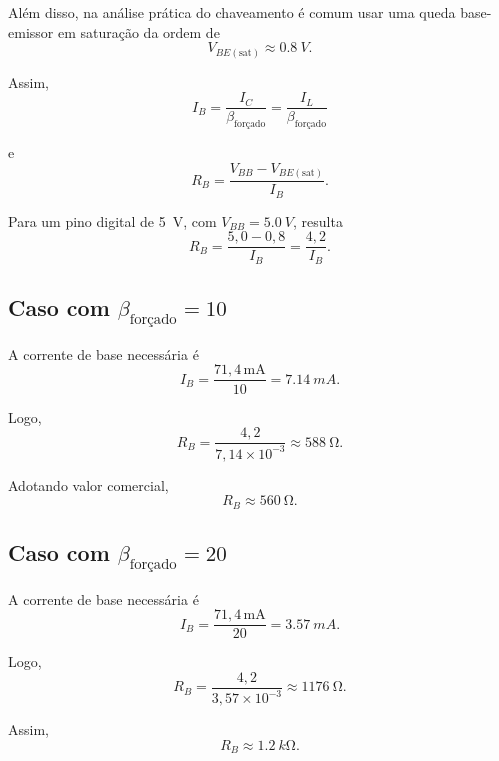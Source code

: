 \documentclass[12pt,a4paper]{article}
\newcommand{\Vbb}{V_{BB}}
\newcommand{\Vbesat}{V_{BE(\mathrm{sat})}}
\newcommand{\Ic}{I_C}
\newcommand{\Ib}{I_B}
\newcommand{\Il}{I_L}
\newcommand{\Rb}{R_B}
\newcommand{\betaf}{\beta_{\text{forçado}}}
\begin{document}
Além disso, na análise prática do chaveamento é comum usar uma queda base-emissor em saturação da ordem de
\begin{equation}
\Vbesat \approx \SI{0,8}{V}.
\end{equation}

Assim,
\begin{equation}
\Ib = \frac{\Ic}{\betaf} = \frac{\Il}{\betaf}
\end{equation}

e
\begin{equation}
\Rb = \frac{\Vbb - \Vbesat}{\Ib}.
\label{eq:rb_sat}
\end{equation}

Para um pino digital de \SI{5}{V}, com $\Vbb = \SI{5,0}{V}$, resulta
\begin{equation}
\Rb = \frac{5,0 - 0,8}{\Ib} = \frac{4,2}{\Ib}.
\end{equation}

\subsection{Caso com $\betaf = 10$}

A corrente de base necessária é
\begin{equation}
\Ib = \frac{71,4\,\mathrm{mA}}{10} = \SI{7,14}{mA}.
\end{equation}

Logo,
\begin{equation}
\Rb = \frac{4,2}{7,14 \times 10^{-3}} \approx \SI{588}{\ohm}.
\end{equation}

Adotando valor comercial,
\begin{equation}
\boxed{\Rb \approx \SI{560}{\ohm}}.
\end{equation}

\subsection{Caso com $\betaf = 20$}

A corrente de base necessária é
\begin{equation}
\Ib = \frac{71,4\,\mathrm{mA}}{20} = \SI{3,57}{mA}.
\end{equation}

Logo,
\begin{equation}
\Rb = \frac{4,2}{3,57 \times 10^{-3}} \approx \SI{1176}{\ohm}.
\end{equation}

Assim,
\begin{equation}
\boxed{\Rb \approx \SI{1,2}{k\ohm}}.
\end{equation}
\end{document}

